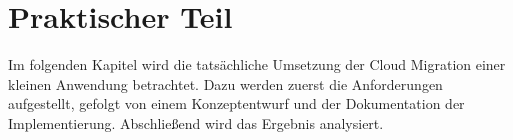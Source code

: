 \chapter{Praktischer Teil}

Im folgenden Kapitel wird die tatsächliche Umsetzung der Cloud Migration einer kleinen Anwendung betrachtet.
Dazu werden zuerst die Anforderungen aufgestellt, gefolgt von einem Konzeptentwurf und der Dokumentation der
Implementierung. Abschließend wird das Ergebnis analysiert.




